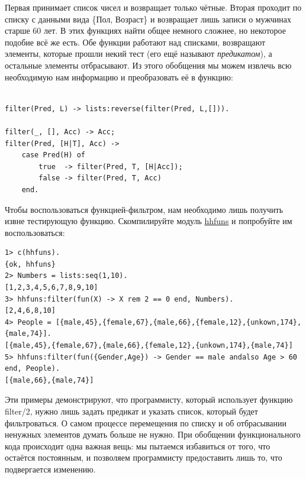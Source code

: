\documentclass[a4paper,12pt]{report}
\newcommand{\ops}{\colorbox{lgreen}}
\begin{document}
Первая принимает список чисел и возвращает только чётные. Вторая проходит по списку с данными вида \{Пол, Возраст\} и возвращает лишь записи о мужчинах старше 60 лет. В этих функциях найти общее немного сложнее, но некоторое подобие всё же есть. Обе функции работают над списками, возвращают элементы, которые прошли некий тест (его ещё называют \emph{предикатом}), а остальные элементы отбрасывают. Из этого обобщения мы можем извлечь всю необходимую нам информацию и преобразовать её в функцию:
\begin{lstlisting}[style=erlang]

filter(Pred, L) -> lists:reverse(filter(Pred, L,[])).
 
filter(_, [], Acc) -> Acc;
filter(Pred, [H|T], Acc) ->
    case Pred(H) of
        true  -> filter(Pred, T, [H|Acc]);
        false -> filter(Pred, T, Acc)
    end.
\end{lstlisting}

Чтобы воспользоваться функцией\--фильтром, нам необходимо лишь получить извне тестирующую функцию. Скомпилируйте модуль \ops{\href{http://learnyousomeerlang.com/static/erlang/hhfuns.erl}{hhfuns}} и попробуйте им воспользоваться:
\begin{lstlisting}[style=erlang]
1> c(hhfuns).
{ok, hhfuns}
2> Numbers = lists:seq(1,10).
[1,2,3,4,5,6,7,8,9,10]
3> hhfuns:filter(fun(X) -> X rem 2 == 0 end, Numbers).
[2,4,6,8,10]
4> People = [{male,45},{female,67},{male,66},{female,12},{unkown,174},{male,74}].
[{male,45},{female,67},{male,66},{female,12},{unkown,174},{male,74}]
5> hhfuns:filter(fun({Gender,Age}) -> Gender == male andalso Age > 60 end, People).
[{male,66},{male,74}]
\end{lstlisting}

Эти примеры демонстрируют, что программисту, который использует функцию \ops{filter/2}, нужно лишь задать предикат и указать список, который будет фильтроваться. О самом процессе перемещения по списку и об отбрасывании ненужных элементов думать больше не нужно. При обобщении функционального кода происходит одна важная вещь: мы пытаемся избавиться от того, что остаётся постоянным, и позволяем программисту предоставить лишь то, что подвергается изменению.
\end{document}
